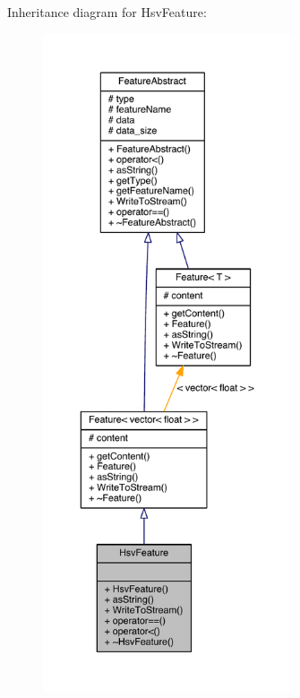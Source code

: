 Inheritance diagram for Hsv\+Feature\+:
\nopagebreak
\begin{figure}[H]
\begin{center}
\leavevmode
\includegraphics[height=550pt]{class_hsv_feature__inherit__graph}
\end{center}
\end{figure}


